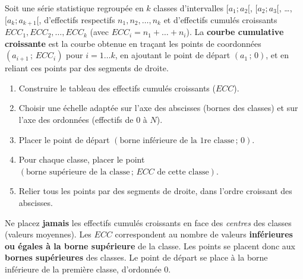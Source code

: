 \documentclass[11pt]{article}
\begin{document}
\begin{definition}
Soit une série statistique regroupée en $k$ classes d'intervalles $[a_1; a_2[$, $[a_2; a_3[$, …, $[a_k; a_{k+1}[$, d'effectifs respectifs $n_1, n_2, \dots, n_k$ et d'effectifs cumulés croissants $ECC_1, ECC_2, \dots, ECC_k$ (avec $ECC_i = n_1 + \dots + n_i$). La \textbf{courbe cumulative croissante} est la courbe obtenue en traçant les points de coordonnées $(a_{i+1}\,;\, ECC_i)$ pour $i = 1 \dots k$, en ajoutant le point de départ $(a_1\,;\, 0)$, et en reliant ces points par des segments de droite.
\end{definition}

\begin{methode}
\begin{enumerate}
\item Construire le tableau des effectifs cumulés croissants ($ECC$).
\item Choisir une échelle adaptée sur l'axe des abscisses (bornes des classes) et sur l'axe des ordonnées (effectifs de 0 à $N$).
\item Placer le point de départ $(\text{borne inférieure de la 1re classe}\,;\, 0)$.
\item Pour chaque classe, placer le point $(\text{borne supérieure de la classe}\,;\, ECC \text{ de cette classe})$.
\item Relier tous les points par des segments de droite, dans l'ordre croissant des abscisses.
\end{enumerate}
\end{methode}

\begin{attention}
Ne placez \textbf{jamais} les effectifs cumulés croissants en face des \emph{centres} des classes (valeurs moyennes). Les $ECC$ correspondent au nombre de valeurs \textbf{inférieures ou égales à la borne supérieure} de la classe. Les points se placent donc aux \textbf{bornes supérieures} des classes. Le point de départ se place à la borne inférieure de la première classe, d'ordonnée 0.
\end{attention}
\end{document}
